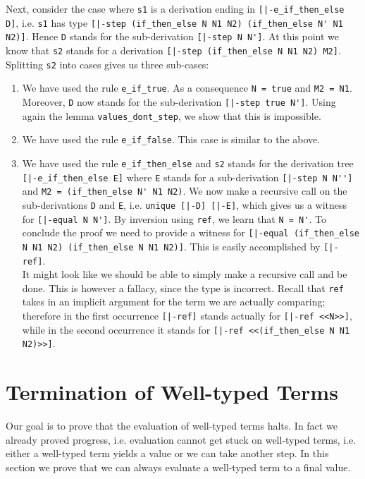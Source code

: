 Next, consider the case where \lstinline!s1! is a derivation ending in 
\lstinline![|-e_if_then_else D]!, i.e. \lstinline!s1! has type 
\lstinline![|-step (if_then_else N N1 N2) (if_then_else N' N1 N2)]!. Hence \lstinline!D! stands for the sub-derivation 
\lstinline![|-step N N']!. At this point we know that \lstinline!s2! stands
for a derivation \lstinline![|-step (if_then_else N N1 N2) M2]!. Splitting
\lstinline!s2! into cases gives us three sub-cases:

\begin{enumerate}
\item We have used the rule \lstinline!e_if_true!. As a consequence
  \lstinline!N = true! and \lstinline!M2 = N1!. Moreover,
  \lstinline!D! now stands for the sub-derivation \lstinline![|-step true N']!.
  Using again the lemma \lstinline!values_dont_step!, we show that this is impossible.

\item We have used the rule \lstinline!e_if_false!. This case is
  similar to the above.

\item We have used the rule \lstinline!e_if_then_else! and 
  \lstinline!s2! stands for the derivation tree 
\mbox{\lstinline![|-e_if_then_else E]!} where \lstinline!E! stands for a sub-derivation
\lstinline![|-step N N'']! and \lstinline!M2 = (if_then_else N' N1 N2)!.
We now make a recursive call on the sub-derivations \lstinline!D! and
\lstinline!E!, i.e. \lstinline!unique [|-D] [|-E]!, which gives us a
witness for 
\mbox{\lstinline![|-equal N N']!}. By inversion using \lstinline!ref!, we learn that
\lstinline!N = N'!. To conclude the proof we need to provide a witness for
\lstinline![|-equal (if_then_else N N1 N2) (if_then_else N N1 N2)]!. This is easily
accomplished by \lstinline![|-ref]!. \\[0.5em]
It might look like we should be able to simply make a recursive call
and be done. This is
however a fallacy, since the type is incorrect. Recall that \lstinline!ref!
takes in an implicit argument for the term we are actually comparing; therefore
in the first occurrence \lstinline![|-ref]! stands actually for
\lstinline![|-ref <<N>>]!, while in the second occurrence it %
stands for \lstinline![|-ref <<(if_then_else N N1 N2)>>]!.
\end{enumerate}


\section{Termination of Well-typed Terms}
Our goal is to prove that the evaluation of well-typed terms halts. In
fact we already proved progress, i.e. evaluation cannot get stuck on
well-typed terms, i.e. either a well-typed term yields a value or we
can take another step. In this section we prove that we can always
evaluate a well-typed term to a final value.

